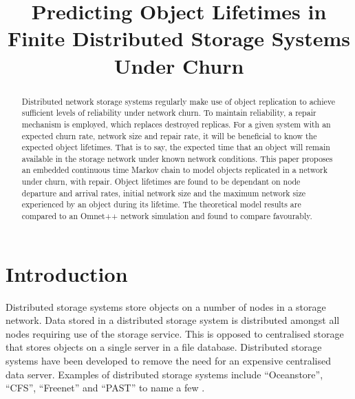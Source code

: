 \documentclass[10pt,a4paper,conference]{IEEEtran}
\begin{document}
%
\title{Predicting Object Lifetimes in Finite Distributed Storage Systems Under Churn}

\author{}

\maketitle

\begin{abstract}
Distributed network storage systems regularly make use of object replication to achieve sufficient levels of reliability under network churn. To maintain reliability, a repair mechanism is employed, which replaces destroyed replicas. For a given system with an expected churn rate, network size and repair rate, it will be beneficial to know the expected object lifetimes. That is to say, the expected time that an object will remain available in the storage network under known network conditions. This paper proposes an embedded continuous time Markov chain to model objects replicated in a network under churn, with repair. Object lifetimes are found to be dependant on node departure and arrival rates, initial network size and the maximum network size experienced by an object during its lifetime. The theoretical model results are compared to an Omnet++ network simulation and found to compare favourably.
\end{abstract}

\section{Introduction}
\label{introduction}

Distributed storage systems store objects on a number of nodes in a storage network. Data stored in a distributed storage system is distributed amongst all nodes requiring use of the storage service. This is opposed to centralised storage that stores objects on a single server in a file database. Distributed storage systems have been developed to remove the need for an expensive centralised data server. Examples of distributed storage systems include ``Oceanstore'', ``CFS'', ``Freenet'' and ``PAST'' to name a few \cite{distributed_storage_survey}.
\end{document}
